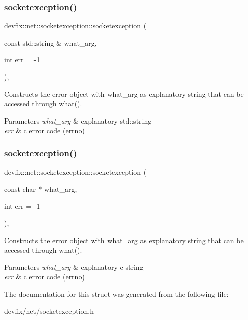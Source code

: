 \subsubsection{\texorpdfstring{socketexception()}{socketexception()}\hspace{0.1cm}{\footnotesize\ttfamily [1/2]}}
{\footnotesize\ttfamily devfix\+::net\+::socketexception\+::socketexception (\begin{DoxyParamCaption}\item[{const std\+::string \&}]{what\+\_\+arg,  }\item[{int}]{err = {\ttfamily -\/1} }\end{DoxyParamCaption})\hspace{0.3cm}{\ttfamily [inline]}, {\ttfamily [explicit]}}

Constructs the error object with what\+\_\+arg as explanatory string that can be accessed through what(). 
\begin{DoxyParams}{Parameters}
{\em what\+\_\+arg} & explanatory std\+::string \\
\hline
{\em err} & c error code (errno) \\
\hline
\end{DoxyParams}
\mbox{\label{structdevfix_1_1net_1_1socketexception_a6da69f635eb11f932a0e960545d023bd}} 
\subsubsection{\texorpdfstring{socketexception()}{socketexception()}\hspace{0.1cm}{\footnotesize\ttfamily [2/2]}}
{\footnotesize\ttfamily devfix\+::net\+::socketexception\+::socketexception (\begin{DoxyParamCaption}\item[{const char $\ast$}]{what\+\_\+arg,  }\item[{int}]{err = {\ttfamily -\/1} }\end{DoxyParamCaption})\hspace{0.3cm}{\ttfamily [inline]}, {\ttfamily [explicit]}}

Constructs the error object with what\+\_\+arg as explanatory string that can be accessed through what(). 
\begin{DoxyParams}{Parameters}
{\em what\+\_\+arg} & explanatory c-\/string \\
\hline
{\em err} & c error code (errno) \\
\hline
\end{DoxyParams}


The documentation for this struct was generated from the following file\+:\begin{DoxyCompactItemize}
\item 
devfix/net/socketexception.\+h\end{DoxyCompactItemize}
